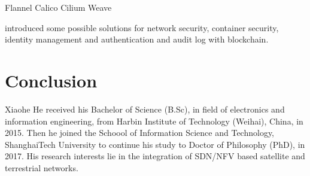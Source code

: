 \documentclass[12pt, draftclsnofoot, onecolumn]{IEEEtran}
\begin{document}
\begin{table}
	
\end{table}
Flannel
Calico 
Cilium
Weave




\cite{mendki2021securing} introduced some possible solutions for network security, container security, identity management and authentication and audit log with blockchain.


\section{Conclusion}



\ifCLASSOPTIONcaptionsoff
  \newpage
\fi

{}


\begin{IEEEbiography}{Xiaohe He}
received his Bachelor of Science (B.Sc), in field of electronics and information engineering, from Harbin Institute of Technology (Weihai), China, in 2015. Then he joined the Schoool of Information Science and Technology, ShanghaiTech University to continue his study to Doctor of Philosophy (PhD), in 2017. 
His research interests lie in the integration of SDN/NFV based satellite and terrestrial networks.
\end{IEEEbiography}
\end{document}

